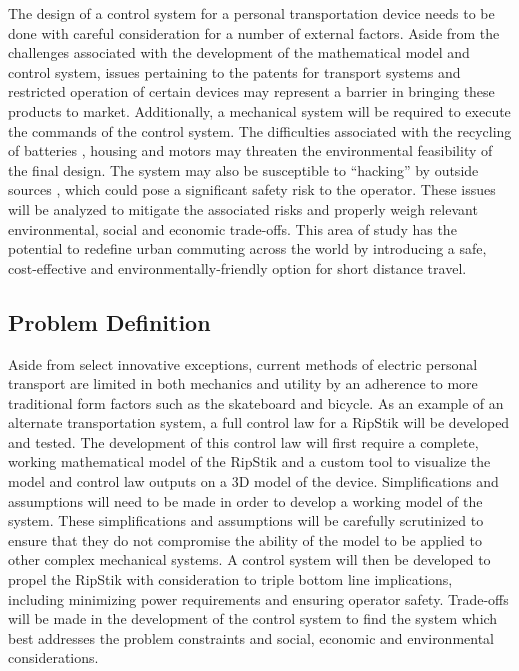 The design of a control system for a personal transportation device needs to be done with careful consideration for a number of external factors. 
Aside from the challenges associated with the development of the mathematical model and control system, issues pertaining to the patents for transport systems \cite{casterboardPatent} and restricted operation of certain devices \cite{TOLaws} may represent a barrier in bringing these products to market. 
Additionally, a mechanical system will be required to execute the commands of the control system. 
The difficulties associated with the recycling of batteries \cite{BatteryRecharge}, housing \cite{PlasticAssessment} and motors may threaten the environmental feasibility of the final design. 
The system may also be susceptible to ``hacking'' by outside sources \cite{DEFCON}, which could pose a significant safety risk to the operator. 
These issues will be analyzed to mitigate the associated risks and properly weigh relevant environmental, social and economic trade-offs.
This area of study has the potential to redefine urban commuting across the world by introducing a safe, cost-effective and environmentally-friendly option for short distance travel. 

\subsection{Problem Definition}

Aside from select innovative exceptions, current methods of electric personal transport are limited in both mechanics and utility by an adherence to more traditional form factors such as the skateboard and bicycle. 
As an example of an alternate transportation system, a full control law for a RipStik will be developed and tested. 
The development of this control law will first require a complete, working mathematical model of the RipStik and a custom tool to visualize the model and control law outputs on a 3D model of the device. 
Simplifications and assumptions will need to be made in order to develop a working model of the system. 
These simplifications and assumptions will be carefully scrutinized to ensure that they do not compromise the ability of the model to be applied to other complex mechanical systems. 
A control system will then be developed to propel the RipStik with consideration to triple bottom line implications, including minimizing power requirements and ensuring operator safety. 
Trade-offs will be made in the development of the control system to find the system which best addresses the problem constraints and social, economic and environmental considerations. 


